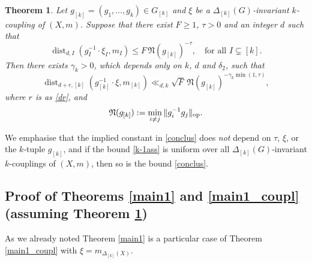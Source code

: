 \documentclass[11pt,reqno,a4paper]{amsart}
\numberwithin{equation}{section}
\DeclareMathOperator{\dist}{dist}
\theoremstyle{theorem}
\newtheorem{theorem}{Theorem}[section]
\theoremstyle{definition}
\begin{document}
\begin{theorem}
\label{main1_real}
Let $g_{[k]} = (g_1,\ldots,g_k) \in G_{[k]}$ and
$\xi$ be a $\Delta_{[k]}(G)$-invariant $k$-coupling of $(X,m)$.
Suppose that there exist $F \geq 1$, $\tau > 0$ and an integer $d$ such that
\begin{equation}
\label{k-1ass}
\dist_{d,I}(g_I^{-1} \cdot \xi_I, m_I) \leq F\, \mathfrak{N}(g_{[k]})^{-\tau}, \quad \textrm{for all $I \subsetneq [k]$}.
\end{equation}
Then there exists $\gamma_k > 0$, which depends only on $k$, $d$ and $\delta_2$, such that
\begin{equation}
\label{conclus}
\dist_{d + r,[k]}(g_{[k]}^{-1} \cdot \xi,m_{[k]}) \ll_{d,k} \sqrt{F} \, \mathfrak{N}(g_{[k]})^{-\gamma_k \min(1,\tau)},
\end{equation}
where $r$ is as \eqref{dr}, and 
$$
\mathfrak{N}(g_{[k]}):=\min_{i\ne j} \|g_i^{-1}g_j\|_{\rm op}.
$$
\end{theorem}

We emphasise that the implied constant in \eqref{conclus} does \emph{not} depend on $\tau$, $\xi$, or the $k$-tuple $g_{[k]}$, and
if the bound \eqref{k-1ass} is uniform over all $\Delta_{[k]}(G)$-invariant $k$-couplings of $(X,m)$, then so is the bound \eqref{conclus}.

\subsection{Proof of Theorems \ref{main1} and \ref{main1_coupl} (assuming Theorem \ref{main1_real})}
\label{sec:proof_lie}

As we already noted Theorem \ref{main1} is a particular case of Theorem \ref{main1_coupl}
with $\xi = m_{\Delta_{[k]}(X)}$.
\end{document}
